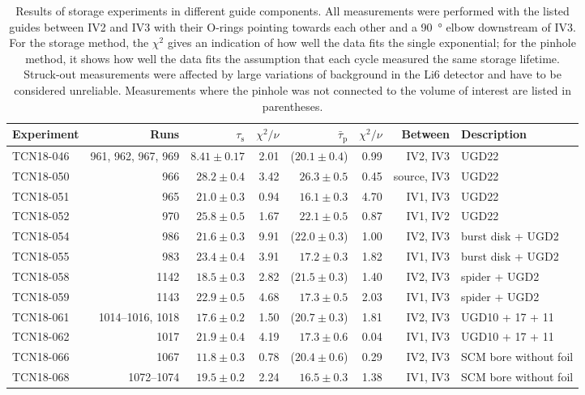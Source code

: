 \documentclass[10pt,letterpaper]{article}
\begin{document}
\begin{table}
\caption{Results of storage experiments in different guide components. All measurements were performed with the listed guides between IV2 and IV3 with their O-rings pointing towards each other and a \SI{90}{\degree} elbow downstream of IV3. For the storage method, the $\chi^2$ gives an indication of how well the data fits the single exponential; for the pinhole method, it shows how well the data fits the assumption that each cycle measured the same storage lifetime. Struck-out measurements were affected by large variations of background in the Li6 detector and have to be considered unreliable. Measurements where the pinhole was not connected to the volume of interest are listed in parentheses.}
\begin{tabular}{l r r r r r r l}
\toprule
Experiment & Runs & $\tau_\mathrm{s}$ & $\chi^2/\nu$ & $\bar{\tau}_\mathrm{p}$ & $\chi^2/\nu$ & Between & Description \\
\midrule
TCN18-046 & 961, 962, 967, 969 & $8.41 \pm 0.17$ & 2.01 & ($20.1 \pm 0.4$) & 0.99 & IV2, IV3 & UGD22 \\
TCN18-050 & 966 & $28.2 \pm 0.4$ & 3.42 & $26.3 \pm 0.5$ & 0.45 & source, IV3 & UGD22 \\
TCN18-051 & 965 & $21.0 \pm 0.3$ & 0.94 & $16.1 \pm 0.3$ & 4.70 & IV1, IV3 & UGD22 \\
TCN18-052 & 970 & $25.8 \pm 0.5$ & 1.67 & $22.1 \pm 0.5$ & 0.87 & IV1, IV2 & UGD22 \\
TCN18-054 & 986 & \sout{$21.6 \pm 0.3$} & 9.91 & ($22.0 \pm 0.3$) & 1.00 & IV2, IV3 & burst disk + UGD2 \\
TCN18-055 & 983 & \sout{$23.4 \pm 0.4$} & 3.91 & $17.2 \pm 0.3$ & 1.82 & IV1, IV3 & burst disk + UGD2 \\
TCN18-058 & 1142 & $18.5 \pm 0.3$ & 2.82 & ($21.5 \pm 0.3$) & 1.40 & IV2, IV3 & spider + UGD2 \\
TCN18-059 & 1143 & $22.9 \pm 0.5$ & 4.68 & $17.3 \pm 0.5$ & 2.03 & IV1, IV3 & spider + UGD2 \\
TCN18-061 & 1014--1016, 1018 & $17.6 \pm 0.2$ & 1.50 & ($20.7 \pm 0.3$) & 1.81 & IV2, IV3 & UGD10 + 17 + 11 \\
TCN18-062 & 1017 & $21.9 \pm 0.4$ & 4.19 & $17.3 \pm 0.6$ & 0.04 & IV1, IV3 & UGD10 + 17 + 11 \\
TCN18-066 & 1067 & $11.8 \pm 0.3$ & 0.78 & ($20.4 \pm 0.6$) & 0.29 & IV2, IV3 & SCM bore without foil \\
TCN18-068 & 1072--1074 & $19.5 \pm 0.2$ & 2.24 & $16.5 \pm 0.3$ & 1.38 & IV1, IV3 & SCM bore without foil \\

\end{tabular}
\end{table}
\end{document}
